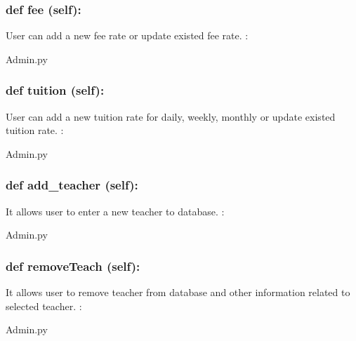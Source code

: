 \hypertarget{class_poly_a14a7ad77ce612b0c54f531d307ee4b39}{
\subsubsection[{def fee(self):}]{\setlength{\rightskip}{0pt plus 5cm}def {fee} (self):}}\label{class_poly_a14a7ad77ce612b0c54f531d307ee4b39}
User can add a new fee rate or update existed fee rate.
:\begin{DoxyCompactItemize}
\item 
Admin.\-py\end{DoxyCompactItemize}

\hypertarget{class_poly_a14a7ad77ce612b0c54f531d307ee4b39}{
\subsubsection[{def tuition(self):}]{\setlength{\rightskip}{0pt plus 5cm}def {tuition} (self):}}\label{class_poly_a14a7ad77ce612b0c54f531d307ee4b39}
User can add a new tuition rate for daily, weekly, monthly or update existed tuition rate.
:\begin{DoxyCompactItemize}
\item 
Admin.\-py\end{DoxyCompactItemize}

\hypertarget{class_poly_a14a7ad77ce612b0c54f531d307ee4b39}{
\subsubsection[{def add_teacher(self):}]{\setlength{\rightskip}{0pt plus 5cm}def {add\_teacher} (self):}}\label{class_poly_a14a7ad77ce612b0c54f531d307ee4b39}
It allows user to enter a new teacher to database.
:\begin{DoxyCompactItemize}
\item 
Admin.\-py\end{DoxyCompactItemize}

\hypertarget{class_poly_a14a7ad77ce612b0c54f531d307ee4b39}{
\subsubsection[{def removeTeach(self):}]{\setlength{\rightskip}{0pt plus 5cm}def {removeTeach} (self):}}\label{class_poly_a14a7ad77ce612b0c54f531d307ee4b39}
It allows user to remove teacher from database and other information related to selected teacher.
:\begin{DoxyCompactItemize}
\item 
Admin.\-py\end{DoxyCompactItemize}

